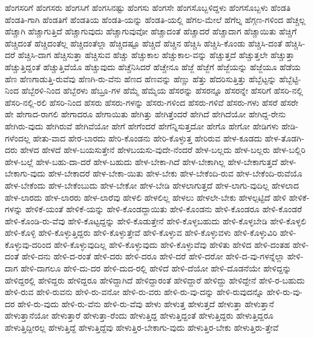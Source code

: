 {ಹೆಂಗಸರಿಗೆ
ಹೆಂಗಸರು
ಹೆಂಗಸಿಗೆ
ಹೆಂಗಸಿನಷ್ಟು
ಹೆಂಗಸು
ಹೆಂಗಸೇ
ಹೆಂಗಸೊಬ್ಬಳಿದ್ದಳು
ಹೆಂಗಸೊಬ್ಬಳು
ಹೆಂಡತಿ
ಹೆಂಡತಿ-ಗಾಗಿ
ಹೆಂಡತಿಗೆ
ಹೆಂಡತಿಯ
ಹೆಂಡತಿ-ಯನ್ನು
ಹೆಂಡತಿ-ಯಲ್ಲಿ
ಹೆಗಲ-ಮೇಲೆ
ಹೆಗೆಲ್ನ
ಹೆಗ್ಗಣ-ಗಳಿಂದ
ಹೆಚ್ಚಲ್ಲ
ಹೆಚ್ಚಾಗಿ
ಹೆಚ್ಚಾಗುತ್ತಿದೆ
ಹೆಚ್ಚಾಗುವುದು
ಹೆಚ್ಚಾಗುವುವೋ
ಹೆಚ್ಚಾದಂತೆ
ಹೆಚ್ಚಾದರೆ
ಹೆಚ್ಚಾದಾಗ
ಹೆಚ್ಚಾಯಿತು
ಹೆಚ್ಚಿಗೆ
ಹೆಚ್ಚಿದಂತೆ
ಹೆಚ್ಚಿದಂತೆಲ್ಲ
ಹೆಚ್ಚಿದಂತೆಲ್ಲಾ
ಹೆಚ್ಚಿದಷ್ಟೂ
ಹೆಚ್ಚಿದೆ
ಹೆಚ್ಚಿನ
ಹೆಚ್ಚಿಸಿ
ಹೆಚ್ಚಿಸಿ-ಕೊಂಡು
ಹೆಚ್ಚಿಸಿ-ದಂತೆ
ಹೆಚ್ಚಿಸಿ-ದರೆ
ಹೆಚ್ಚಿಸಿ-ದಾಗ
ಹೆಚ್ಚಿಸುತ್ತಾ
ಹೆಚ್ಚಿಸುವ
ಹೆಚ್ಚು
ಹೆಚ್ಚುಕಾಲ
ಹೆಚ್ಚುಕಾಲ-ವನ್ನು
ಹೆಚ್ಚುತ್ತದೆ
ಹೆಚ್ಚುತ್ತಲೇ
ಹೆಚ್ಚುತ್ತಾ
ಹೆಚ್ಚುತ್ತಿದ್ದಂತೆ
ಹೆಚ್ಚುತ್ತಿವೆಯೊ
ಹೆಚ್ಚುವುದು
ಹೆಚ್ಚೆನಿಸಿದರೆ
ಹೆಚ್ಚೇನೂ
ಹೆಜ್ಜೆ
ಹೆಜ್ಜೆಗೆ
ಹೆಜ್ಜೆಯನ್ನು
ಹೆಜ್ಜೆಯೂ
ಹೆಡೆಯ
ಹೆಣ
ಹೆಣಗಾಡುತ್ತಿ-ರುವೆವು
ಹೆಣಗಿ-ರು-ವೆನು
ಹೆಣದ
ಹೆಣವನ್ನು
ಹೆಣ್ಣು
ಹೆತ್ತು
ಹೆದರಿಸುತ್ತಿತ್ತು
ಹೆಬ್ಬೆಟ್ಟನ್ನು
ಹೆಬ್ಬೆಟ್ಟಿ-ನಿಂದ
ಹೆಬ್ಬೆರಳಿ-ನಿಂದ
ಹೆಬ್ಬೆರಳು
ಹೆಬ್ರೂ-ಗಳ
ಹೆಮ್ಮೆ
ಹೆಮ್ಮೆಯ
ಹೆಸರನ್ನು
ಹೆಸರನ್ನೂ
ಹೆಸರನ್ನೇ
ಹೆಸರಿಗೆ
ಹೆಸರಿ-ನಲ್ಲಿ
ಹೆಸರಿ-ನಲ್ಲಿ-ರಲಿ
ಹೆಸರಿ-ನಿಂದ
ಹೆಸರು
ಹೆಸರು-ಗಳನ್ನು
ಹೆಸರು-ಗಳಿಂದ
ಹೆಸರು-ಗಳಿವೆ
ಹೆಸರು-ಗಳು
ಹೆಸರೆ
ಹೆಸರೇ
ಹೇ
ಹೇಗಾದ-ರಾಗಲಿ
ಹೇಗಾದರೂ
ಹೇಗಾಯಿತು
ಹೇಗಿತ್ತು
ಹೇಗಿತ್ತೆಂದರೆ
ಹೇಗಿದೆ
ಹೇಗಿದೆಯೋ
ಹೇಗಿದ್ದ-ರೇನು
ಹೇಗಿರು-ವುದು
ಹೇಗಿರುವೆ
ಹೇಗಿವೆಯೋ
ಹೇಗೆ
ಹೇಗೆಂದರೆ
ಹೇಗೆನ್ನಿಸುತ್ತದೋ
ಹೇಗೊ
ಹೇಗೋ
ಹೇಡಿಗಳು
ಹೇಡಿ-ಗಳೆಂದಲ್ಲ
ಹೇತು-ವಾದ
ಹೇರ-ಬಾರದು
ಹೇರಿ-ಕೊಂಡನು
ಹೇರಿ-ಕೊಳ್ಳುತ್ತ
ಹೇರಿರುವ
ಹೇಳ-ಕೂಡದು
ಹೇಳ-ತೊಡಗಿ-ದರು
ಹೇಳದ
ಹೇಳದೆ
ಹೇಳ-ಬಯಸುತ್ತೇನೆ
ಹೇಳಬಯಸು-ವುದೇ-ನೆಂದರೆ
ಹೇಳ-ಬಲ್ಲದು
ಹೇಳ-ಬಲ್ಲರು
ಹೇಳ-ಬಲ್ಲಿರಿ
ಹೇಳ-ಬಲ್ಲೆ
ಹೇಳ-ಬಹು-ದಾ-ದರೆ
ಹೇಳ-ಬಹುದು
ಹೇಳ-ಬೇಕಾ-ಗಿದೆ
ಹೇಳ-ಬೇಕಾಗಿಲ್ಲ
ಹೇಳ-ಬೇಕಾಗುತ್ತದೆ
ಹೇಳ-ಬೇಕಾಗು-ವುದು
ಹೇಳ-ಬೇಕಾದರೆ
ಹೇಳ-ಬೇಕಾ-ಯಿತು
ಹೇಳ-ಬೇಕು
ಹೇಳ-ಬೇಕೆಂದಿ-ರುವ
ಹೇಳ-ಬೇಕೆಂದಿ-ರುವೆಯೊ
ಹೇಳ-ಬೇಕೆಂದು
ಹೇಳ-ಬೇಕೆಂಬುದು
ಹೇಳ-ಬೇಕೋ
ಹೇಳ-ಬೇಡಿ
ಹೇಳಲಾಗುತ್ತದೆ
ಹೇಳ-ಲಾಗು-ವುದಿಲ್ಲ
ಹೇಳಲಾದ
ಹೇಳ-ಲಾರದು
ಹೇಳ-ಲಾರರು
ಹೇಳ-ಲಾರೆವು
ಹೇಳಲಿ
ಹೇಳಲಿಲ್ಲ
ಹೇಳಲು
ಹೇಳಲೇ-ಬೇಕು
ಹೇಳಲ್ಪಟ್ಟಿದೆ
ಹೇಳಿ
ಹೇಳಿಕೆ-ಗಳನ್ನು
ಹೇಳಿಕೆ-ಯಂತೆ
ಹೇಳಿಕೆ-ಯನ್ನು
ಹೇಳಿ-ಕೊಂಡದ್ದಾಯಿತು
ಹೇಳಿ-ಕೊಂಡನು
ಹೇಳಿ-ಕೊಂಡರೂ
ಹೇಳಿ-ಕೊಂಡರೆ
ಹೇಳಿ-ಕೊಂಡಿ-ರು-ವೆವು
ಹೇಳಿ-ಕೊಟ್ಟದ್ದನ್ನು
ಹೇಳಿ-ಕೊಡುತ್ತೇನೆ
ಹೇಳಿ-ಕೊಳ್ಳಬಹುದು
ಹೇಳಿ-ಕೊಳ್ಳಬೇಡಿ
ಹೇಳಿ-ಕೊಳ್ಳಲಿ
ಹೇಳಿ-ಕೊಳ್ಳಿ
ಹೇಳಿ-ಕೊಳ್ಳುತ್ತಿದ್ದರು
ಹೇಳಿ-ಕೊಳ್ಳುತ್ತೇವೆ
ಹೇಳಿ-ಕೊಳ್ಳುವ
ಹೇಳಿ-ಕೊಳ್ಳುವಳು
ಹೇಳಿ-ಕೊಳ್ಳುವಿರಿ
ಹೇಳಿ-ಕೊಳ್ಳುವು-ದರಿಂದ
ಹೇಳಿ-ಕೊಳ್ಳುವುದಿಲ್ಲ
ಹೇಳಿ-ಕೊಳ್ಳುವುದು
ಹೇಳಿ-ಕೊಳ್ಳುವೆವು
ಹೇಳಿತು
ಹೇಳಿದ
ಹೇಳಿ-ದಂತಹ
ಹೇಳಿ-ದಂತೆ
ಹೇಳಿ-ದನು
ಹೇಳಿ-ದ-ರಂತೆ
ಹೇಳಿ-ದರು
ಹೇಳಿ-ದರೂ
ಹೇಳಿ-ದರೆ
ಹೇಳಿ-ದರೋ
ಹೇಳಿ-ದ-ವು-ಗಳನ್ನೆಲ್ಲಾ
ಹೇಳಿ-ದಾಗ
ಹೇಳಿ-ದಾಗಲೂ
ಹೇಳಿ-ದು-ದರ
ಹೇಳಿ-ದುದ-ರಲ್ಲಿ
ಹೇಳಿದೆ
ಹೇಳಿ-ದೆಯೋ
ಹೇಳಿ-ದೊಡನೆಯೇ
ಹೇಳಿದ್ದನ್ನು
ಹೇಳಿದ್ದರಲ್ಲಿ
ಹೇಳಿದ್ದರು
ಹೇಳಿದ್ದರೂ
ಹೇಳಿದ್ದಾಗಿದೆ
ಹೇಳಿದ್ದಾರಂತೆ
ಹೇಳಿದ್ದಾರೆ
ಹೇಳಿದ್ದು
ಹೇಳಿದ್ದೇನೆ
ಹೇಳಿ-ರ-ಬಹುದು
ಹೇಳಿ-ರುವ
ಹೇಳಿ-ರುವನು
ಹೇಳಿ-ರು-ವನೋ
ಹೇಳಿ-ರು-ವರು
ಹೇಳಿ-ರು-ವು-ದನ್ನು
ಹೇಳಿ-ರುವುದನ್ನೊ
ಹೇಳಿ-ರು-ವು-ದರ
ಹೇಳಿ-ರು-ವುದು
ಹೇಳಿ-ರು-ವೆನು
ಹೇಳಿ-ರು-ವೆವು
ಹೇಳು
ಹೇಳುತ್ತ
ಹೇಳುತ್ತದೆ
ಹೇಳುತ್ತಾ
ಹೇಳುತ್ತಾನೆ
ಹೇಳುತ್ತಾನೆಯೋ
ಹೇಳುತ್ತಾರೆ
ಹೇಳುತ್ತಾ-ರೆಂದು
ಹೇಳುತ್ತಿದ್ದ
ಹೇಳುತ್ತಿದ್ದಂತೆ
ಹೇಳುತ್ತಿದ್ದರು
ಹೇಳುತ್ತಿದ್ದರೂ
ಹೇಳುತ್ತಿದ್ದೀರಲ್ಲ
ಹೇಳುತ್ತಿದ್ದೆ
ಹೇಳುತ್ತಿದ್ದೆವು
ಹೇಳುತ್ತಿರ-ಬೇಕಾಗು-ವುದು
ಹೇಳುತ್ತಿರ-ಬೇಕು
ಹೇಳುತ್ತಿರು-ತ್ತೇವೆ
}
